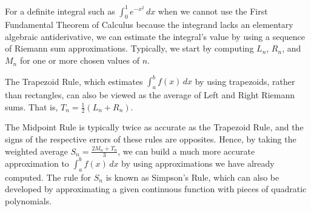 \begin{summary}
  \item For a definite integral such as $\int_0^1 e^{-x^2} \, dx$ when we cannot use the First Fundamental Theorem of Calculus because the integrand lacks an elementary algebraic antiderivative, we can estimate the integral's value by using a sequence of Riemann sum approximations.  Typically, we start by computing $L_n$, $R_n$, and $M_n$ for one or more chosen values of $n$.
  \item The Trapezoid Rule, which estimates $\int_a^b f(x) \, dx$ by using trapezoids, rather than rectangles, can also be viewed as the average of Left and Right Riemann sums.  That is, $T_n = \frac{1}{2}(L_n + R_n)$.  
  \item The Midpoint Rule is typically twice as accurate as the Trapezoid Rule, and the signs of the respective errors of these rules are opposites.  Hence, by taking the weighted average $S_n = \frac{2M_n + T_n}{3}$, we can build a much more accurate approximation to $\int_a^b f(x) \, dx$ by using approximations we have already computed.  The rule for $S_n$ is known as Simpson's Rule, which can also be developed by approximating a given continuous function with pieces of quadratic polynomials.
\end{summary}

\clearpage

 

\cleardoublepage